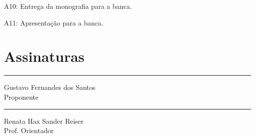\documentclass[tcc-proposta]{texufpel}
\begin{document}
	A10: Entrega da monografia para a banca.
	
	A11: Apresentação para a banca.
	
	


	
\chapter{Assinaturas}
\vspace{2cm}
	
\begin{center}
\rule{8cm}{.3mm}
\medskip
	
	Gustavo Fernandes dos Santos\\
	Proponente
	
\end{center}
	
\vspace{4cm}
	
\begin{center}
\rule{8cm}{.3mm}
\medskip
	
	Renata Hax Sander Reiser\\
	Prof. Orientador
	
\end{center}
\end{document}
